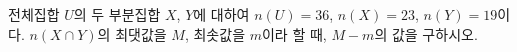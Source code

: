 전체집합 $U$의 두 부분집합 $X$, $Y$에 대하여 $n(U)=36$, $n(X)=23$, $n(Y)=19$이다. $n(X\cap Y)$의 최댓값을 $M$, 최솟값을 $m$이라 할 때, $M-m$의 값을 구하시오.
